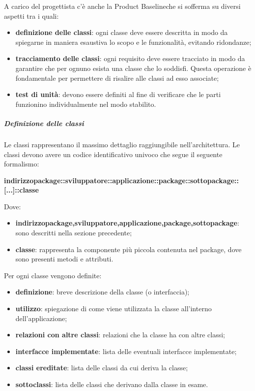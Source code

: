 \begin{itemize}
			A carico del progettista c'è anche la Product Baseline\glosp che si sofferma su diversi aspetti tra i quali:
			\begin{itemize}
				\item \textbf{definizione delle classi}: ogni classe deve essere descritta in modo da spiegarne in maniera esaustiva lo scopo e le funzionalità, evitando ridondanze;
				\item \textbf{tracciamento delle classi}: ogni requisito deve essere tracciato in modo da garantire che per ognuno esista una classe che lo soddisfi. Questa operazione è fondamentale per permettere di risalire alle classi ad esso associate;
				\item \textbf{test di unità}: devono essere definiti al fine di verificare che le parti funzionino individualmente nel modo stabilito.
				\end{itemize}
				\subparagraph{Definizione delle classi}
			Le classi rappresentano il massimo dettaglio raggiungibile nell'architettura. Le classi devono avere un codice identificativo univoco che segue il seguente formalismo:\newline
			\centerline{\textbf{indirizzo\textunderscore package::sviluppatore::applicazione::package::sottopackage::[...]::classe}}\newline
			Dove:
			\begin{itemize}
			\item \textbf{indirizzo\textunderscore package,sviluppatore,applicazione,package,sottopackage}: sono descritti nella sezione precedente;
			\item \textbf{classe}: rappresenta la componente più piccola contenuta nel package, dove sono presenti metodi e attributi.
			\end{itemize}
			Per ogni classe vengono definite:
			\begin{itemize}
			\item \textbf{definizione}: breve descrizione della classe (o interfaccia);
			\item \textbf{utilizzo}: spiegazione di come viene utilizzata la classe all'interno dell'applicazione;
			\item \textbf{relazioni con altre classi}: relazioni che la classe ha con altre classi;
			\item \textbf{interfacce implementate}: lista delle eventuali interfacce implementate;
			\item \textbf{classi ereditate}: lista delle classi da cui deriva la classe;
			\item \textbf{sottoclassi}: lista delle classi che derivano dalla classe in esame.
			\end{itemize}
			\end{itemize}
								
